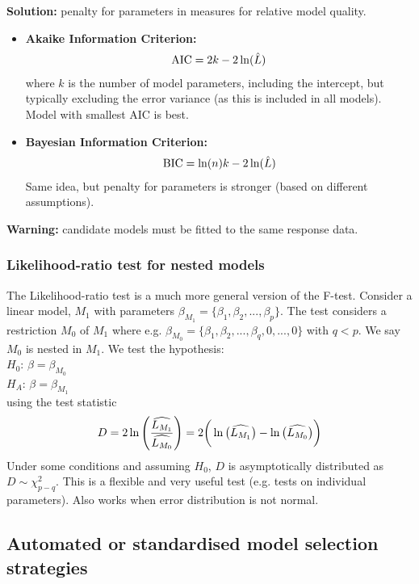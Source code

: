 \textbf{Solution:} penalty for parameters in measures for relative model quality.
\begin{itemize}
	\item \textbf{Akaike Information Criterion:}
	\begin{align}
		\text{AIC} = 2k-2\ln(\hat{L})\notag
	\end{align}
	where $k$ is the number of model parameters, including the intercept, but typically excluding the error variance (as this is included in all models). Model with smallest AIC is best.
	\item \textbf{Bayesian Information Criterion:}
	\begin{align}
		\text{BIC} = \ln(n)k - 2\ln(\hat{L})\notag
	\end{align}
	Same idea, but penalty for parameters is stronger (based on different assumptions).
\end{itemize}

\textbf{Warning:} candidate models must be fitted to the same response data.

\subsubsection{Likelihood-ratio test for nested models}

The Likelihood-ratio test is a much more general version of the F-test. Consider a linear model, $M_1$ with parameters $\beta_{M_1}=\{\beta_1,\beta_2,...,\beta_p\}$. The test considers a restriction $M_0$ of $M_1$ where e.g. $\beta_{M_0} = \{\beta_1,\beta_2,...,\beta_q,0,...,0\}$ with $q<p$. We say $M_0$ is nested in $M_1$. We test the hypothesis: \\
$H_0$: $\beta = \beta_{M_0}$ \\
$H_A$: $\beta = \beta_{M_1}$ \\
using the test statistic 
\begin{align}
	D = 2\ln\left(\frac{\widehat{L_{M_1}}}{\widehat{L_{M_0}}}\right) = 2\bigg(\ln\big(\widehat{L_{M_1}}\big) - \ln\big(\widehat{L_{M_0}}\big)\bigg) \notag
\end{align}
Under some conditions and assuming $H_0$, $D$ is asymptotically distributed as $D\sim\chi^2_{p-q}$. This is a flexible and very useful test (e.g. tests on individual parameters). Also works when error distribution is not normal.

\subsection{Automated or standardised model selection strategies}

